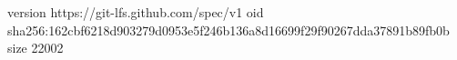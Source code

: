 version https://git-lfs.github.com/spec/v1
oid sha256:162cbf6218d903279d0953e5f246b136a8d16699f29f90267dda37891b89fb0b
size 22002
